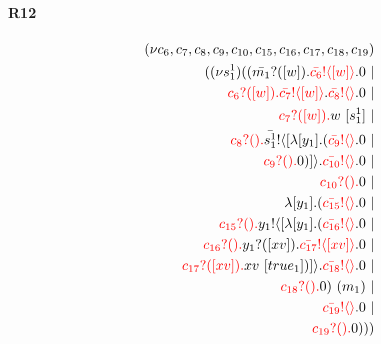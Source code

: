 \documentclass{article}
\begin{document}
\paragraph{R12}
\begin{align*}
 (\nu c_{6},c_{7},c_{8},c_{9},c_{10},c_{15},c_{16},c_{17},c_{18},c_{19}) \\ ( (\nu s^{1}_{1})((\color{black}\bar{m_{1}}?([w]).\color{black}\color{red}\bar{c_{6}}! \langle [w] \rangle \color{black}.0  \ | \\ \color{red}c_{6}?([w]).\color{black}\color{red}\bar{c_{7}}! \langle [w] \rangle \color{black}.\color{red}\bar{c_{8}}! \langle  \rangle \color{black}.0  \ | \\ \color{red}c_{7}?([w]).\color{black}w \ [s^{1}_{1}] \ | \\ \color{red}c_{8}?().\color{black}\color{black}\bar{s^{1}_{1}}! \langle [ \lambda [y_{1}].(\color{red}\bar{c_{9}}! \langle  \rangle \color{black}.0  \ | \\ \color{red}c_{9}?().\color{black}0 )] \rangle \color{black}.\color{red}\bar{c_{10}}! \langle  \rangle \color{black}.0  \ | \\ \color{red}c_{10}?().\color{black}0  \ | \\  \lambda [y_{1}].(\color{red}\bar{c_{15}}! \langle  \rangle \color{black}.0  \ | \\ \color{red}c_{15}?().\color{black}\color{black}y_{1}! \langle [ \lambda [y_{1}].(\color{red}\bar{c_{16}}! \langle  \rangle \color{black}.0  \ | \\ \color{red}c_{16}?().\color{black}\color{black}y_{1}?([xv]).\color{black}\color{red}\bar{c_{17}}! \langle [xv] \rangle \color{black}.0  \ | \\ \color{red}c_{17}?([xv]).\color{black}xv \ [true_{1}])] \rangle \color{black}.\color{red}\bar{c_{18}}! \langle  \rangle \color{black}.0  \ | \\ \color{red}c_{18}?().\color{black}0 ) \ (m_{1}) \ | \\ \color{red}\bar{c_{19}}! \langle  \rangle \color{black}.0  \ | \\ \color{red}c_{19}?().\color{black}0 )))
\end{align*}
\end{document}
